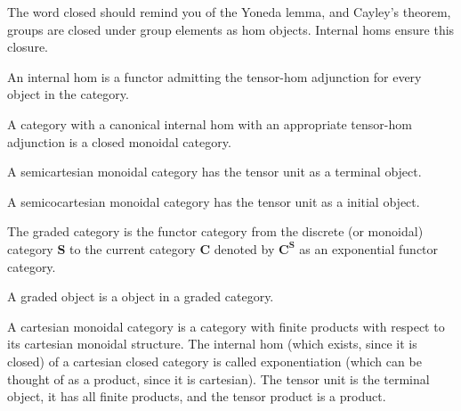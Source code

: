 The word closed should remind you of the Yoneda lemma, and Cayley's theorem, groups are closed under group elements as hom objects. Internal homs ensure this closure.

\begin{definition}
    \label{definition-internal-hom-functor}
    An internal hom is a functor admitting the tensor-hom adjunction for every object in the category. 
\end{definition}

\begin{definition}
    \label{definition-closed-monoidal-category}
    A category with a canonical internal hom with an appropriate tensor-hom adjunction is a closed monoidal category.
\end{definition}

\begin{definition}
    \label{definition-semicartesian-closed-monoidal-category}
    A semicartesian monoidal category has the tensor unit as a terminal object.
\end{definition}

\begin{definition}
    \label{definition-semicocartesian-monoidal-category}
    A semicocartesian monoidal category has the tensor unit as a initial object.
\end{definition}

\begin{definition}
    \label{definition-graded-category}
    The graded category is the functor category from the discrete (or monoidal) category $\mathbf{S}$ to the current category $\mathbf{C}$ denoted by $\mathbf{C}^\mathbf{S}$ as an exponential functor category. 
\end{definition}

\begin{definition}
    \label{definition-graded-object}
    A graded object is a object in a graded category.
\end{definition}

\begin{definition}
    \label{definition-cartesian-monoidal}
    A cartesian monoidal category is a category with finite products with respect to its cartesian monoidal structure. The internal hom (which exists, since it is closed) of a cartesian closed category is called exponentiation (which can be thought of as a product, since it is cartesian). The tensor unit is the terminal object, it has all finite products, and the tensor product is a product. 
\end{definition}

